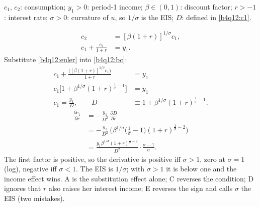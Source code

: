 \begin{sol}
\begin{notacao}
\item $c_1$, $c_2$: consumption; $y_1>0$: period-1 income; $\beta\in(0,1)$: discount factor; $r>-1$: interest rate;
$\sigma>0$: curvature of $u$, so $1/\sigma$ is the EIS; $D$: defined in \eqref{b4q12:c1}.
\end{notacao}
\begin{align}
c_2&=[\beta(1+r)]^{1/\sigma}c_1, \label{b4q12:euler}\\
c_1+\frac{c_2}{1+r}&=y_1. \label{b4q12:bc}
\end{align}
Substitute \eqref{b4q12:euler} into \eqref{b4q12:bc}:
\begin{align}
c_1+\frac{\big([\beta(1+r)]^{1/\sigma}c_1\big)}{1+r}&=y_1\nonumber\\
c_1\big[1+\beta^{1/\sigma}(1+r)^{\frac1\sigma-1}\big]&=y_1\nonumber\\
c_1=\frac{y_1}{D},\qquad D&\equiv1+\beta^{1/\sigma}(1+r)^{\frac1\sigma-1}. \label{b4q12:c1}
\end{align}
\begin{align*}
\frac{\partial c_1}{\partial r}&=-\frac{y_1}{D^2}\,\frac{\partial D}{\partial r}\\
&=-\frac{y_1}{D^2}\,\Big(\beta^{1/\sigma}\Big(\frac1\sigma-1\Big)(1+r)^{\frac1\sigma-2}\Big)\\
&=\frac{y_1\beta^{1/\sigma}(1+r)^{\frac1\sigma-2}}{D^2}\cdot\frac{\sigma-1}{\sigma}.
\end{align*}
The first factor is positive, so the derivative is
positive iff $\sigma>1$, zero at $\sigma=1$ (log), negative iff $\sigma<1$. The EIS is $1/\sigma$; with $\sigma>1$ it is below one and the income
effect wins. A is the substitution effect alone; C reverses the condition; D ignores that $r$ also raises her interest income; E reverses
the sign and calls $\sigma$ the EIS (two mistakes).
\end{sol}
